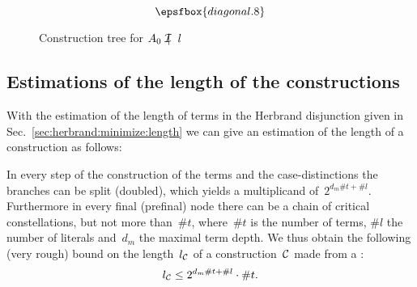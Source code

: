\begin{figure}[ht!]
  \[\epsfbox{diagonal.8}\]
  \caption{Construction tree for $\ao\notcI l$}
  \label{fig:construction}
\end{figure}


\subsection{Estimations of the length of the constructions}
\label{sec:herbrandsketch:estimations}

With the estimation of the length of terms in the Herbrand disjunction
given in Sec.~\ref{sec:herbrand:minimize:length} we can give an
estimation of the length of a construction as follows:

In every step of the construction of the terms and the
case-distinctions the branches can be split (doubled), which yields a
multiplicand of~$2^{d_m\#t+\#l}$. Furthermore in every final
(prefinal) node there can be a chain of critical constellations, but
not more than~$\#t$, where~$\#t$ is the number of terms, $\#l$ the number
of literals and~$d_m$ the maximal term depth. We thus obtain the
following (very rough) bound on the length~$l_\cC$ of a
construction~$\cC$ made from a \HD:
  $$ l_\cC \le 2^{d_m\#t+\#l}\cdot \#t.$$

